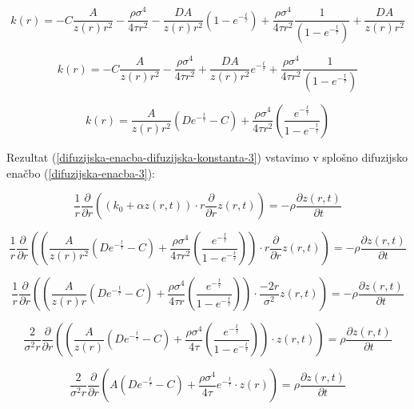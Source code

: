 \documentclass[a4paper, oneside, 12pt]{book}
\begin{document}
\[
  k(r) = - C \frac{A}{z(r) r^2} - \frac{\rho \sigma^4}{4 \tau r^2} - \frac{D A}{z(r) r^2} (1-e^{-\frac{t}{\tau}}) + \frac{\rho \sigma^4}{4 \tau r^2} \frac{1}{(1-e^{-\frac{t}{\tau}})} +  \frac{D A}{z(r) r^2}
\]

\[
  k(r) = - C \frac{A}{z(r) r^2} - \frac{\rho \sigma^4}{4 \tau r^2} + \frac{D A}{z(r) r^2} e^{-\frac{t}{\tau}} + \frac{\rho \sigma^4}{4 \tau r^2} \frac{1}{(1-e^{-\frac{t}{\tau}})} 
\]

\begin{equation}
  k(r) = \frac{A}{z(r) r^2} (D e^{-\frac{t}{\tau}} - C) + \frac{\rho \sigma^4}{4 \tau r^2} \left( \frac{e^{-\frac{t}{\tau}}}{1-e^{-\frac{t}{\tau}}} \right)
  \label{difuzijska-enacba-difuzijska-konstanta-3}
\end{equation}

Rezultat (\ref{difuzijska-enacba-difuzijska-konstanta-3}) vstavimo v splošno difuzijsko enačbo (\ref{difuzijska-enacba-3}):

\begin{equation}
  \frac{1}{r} \frac{\partial}{\partial r} \left((k_0 + \alpha z(r,t)) \cdot r \frac{\partial}{\partial r} z(r,t) \right) = - \rho \frac{\partial z(r,t)}{\partial t}
  \label{difuzijska-enacba-3}
\end{equation}

\[
  \frac{1}{r} \frac{\partial}{\partial r} \left( \left( \frac{A}{z(r) r^2} (D e^{-\frac{t}{\tau}} - C) + \frac{\rho \sigma^4}{4 \tau r^2} \left( \frac{e^{-\frac{t}{\tau}}}{1-e^{-\frac{t}{\tau}}} \right) \right) \cdot r \frac{\partial}{\partial r} z(r,t) \right) = - \rho \frac{\partial z(r,t)}{\partial t}
\]

\[
  \frac{1}{r} \frac{\partial}{\partial r} \left( \left( \frac{A}{z(r) r} (D e^{-\frac{t}{\tau}} - C) + \frac{\rho \sigma^4}{4 \tau r} \left( \frac{e^{-\frac{t}{\tau}}}{1-e^{-\frac{t}{\tau}}} \right) \right) \cdot \frac{-2 r}{\sigma^2} z(r,t) \right) = - \rho \frac{\partial z(r,t)}{\partial t}
\]

\[
  \frac{2}{\sigma^2 r} \frac{\partial}{\partial r} \left( \left(\frac{A}{z(r)} (D e^{-\frac{t}{\tau}} - C) + \frac{\rho \sigma^4}{4 \tau} \left( \frac{e^{-\frac{t}{\tau}}}{1-e^{-\frac{t}{\tau}}} \right) \right) \cdot z(r,t) \right) = \rho \frac{\partial z(r,t)}{\partial t}
\]

\[
  \frac{2}{\sigma^2 r} \frac{\partial}{\partial r} \left( A(D e^{-\frac{t}{\tau}} - C) + \frac{\rho \sigma^4}{4 \tau} e^{-\frac{t}{\tau}} \cdot z(r) \right) = \rho \frac{\partial z(r,t)}{\partial t}
\]
\end{document}
